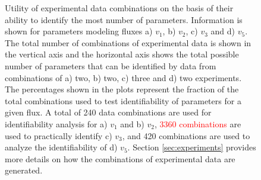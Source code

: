 \documentclass[10pt]{article}
\begin{document}
	\begin{figure}[!tbhp]
		\caption{Utility of experimental data combinations on the basis of their ability to identify the most number of parameters. Information is shown for parameters modeling fluxes a) $v_1$, b) $v_2$, c) $v_3$ and d) $v_5$. The total number of combinations of experimental data is shown in the vertical axis and the horizontal axis shows the total possible number of parameters that can be identified by data from combinations of a) two, b) two, c) three and d) two experiments. The percentages shown in the plots represent the fraction of the total combinations used to test identifiability of parameters for a given flux. A total of 240 data combinations are used for identifiability analysis for a) $v_1$ and b) $v_2$, \textcolor{red}{3360 combinations} are used to practically identify c) $v_3$, and 420 combinations are used to analyze the identifiability of d) $v_5$. Section \ref{sec:experiments} provides more details on how the combinations of experimental data are generated.}\label{fig:data_utility}
	\end{figure}	
\end{document}
